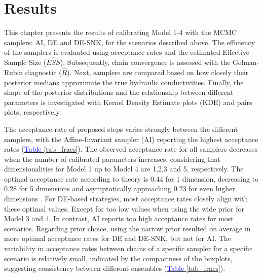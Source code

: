\section{Results}\label{results}
This chapter presents the results of calibrating Model 1-4 with the MCMC samplers: AI, DE and DE-SNK, for the scenarios described above. The efficiency of the samplers is evaluated using acceptance rates and the estimated Effective Sample Size ($\widehat{ESS}$). Subsequently, chain convergence is assessed with the Gelman-Rubin diagnostic ($\hat{R}$). 
Next, samplers are compared based on how closely their posterior medians approximate the true hydraulic conductivities. 
Finally, the shape of the posterior distributions and the relationship between different parameters is investigated with Kernel Density Estimate plots (KDE) and pairs plots, respectively.   

The acceptance rate of proposed steps varies strongly between the different samplers, with the Affine-Invariant sampler (AI) reporting the highest acceptance rates (\hyperref[tab_fracs]{\textcolor{blue}{Table }\ref{tab_fracs}}). The observed acceptance rate for all samplers decreases when the number of calibrated parameters increases, considering that dimensionalities for Model 1 up to Model 4 are 1,2,3 and 5, respectively. 
The optimal acceptance rate according to theory is 0.44 for 1 dimension, decreasing to 0.28 for 5 dimensions and asymptotically approaching 0.23 for even higher dimensions \citep{schmon2022optimal, terbraak2006markov}. For DE-based strategies, most acceptance rates closely align with these optimal values. Except for too low values when using the wide prior for Model 3 and 4. In contrast, AI reports too high acceptance rates for most scenarios. Regarding prior choice, using the narrow prior resulted on average in more optimal acceptance rates for DE and DE-SNK, but not for AI. %
The variability in acceptance rates between chains of a specific sampler for a specific scenario is relatively small, indicated by the compactness of the boxplots, suggesting consistency between different ensembles (\hyperref[tab_fracs]{\textcolor{blue}{Table }\ref{tab_fracs}}).

